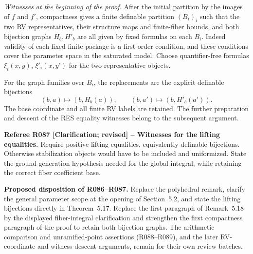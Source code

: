 \documentclass[12pt]{amsart}
\theoremstyle{remark}
\theoremstyle{definition}
\numberwithin{equation}{section}
\theoremstyle{plain}
\begin{document}
{\emph{Witnesses at the beginning of the proof.}
After the initial partition by the images of $f$ and $f'$,
compactness gives a finite definable partition $(B_i)_i$
such that the two RV representatives, their structure maps
and finite-fiber bounds, and both bijection graphs
$H_b,H'_b$ are all given by fixed formulas on each $B_i$.
Indeed validity of each fixed finite package is a first-order
condition, and these conditions cover the parameter space
in the saturated model. Choose quantifier-free formulas
$\xi_i(x,y)$, $\xi'_i(x,y')$ for the two representative objects.

For the graph families over $B_i$, the replacements are the
explicit definable bijections
\[
 (b,a)\longmapsto(b,H_b(a)),\qquad
 (b,a')\longmapsto(b,H'_b(a')).
\]
The base coordinate and all finite RV labels are retained.
The further preparation and descent of the RES equality
witnesses belong to the subsequent argument.
}
\medskip

{\normalfont\small\color{RefereePurple}
\noindent\textbf{Referee R087 [Clarification; revised] --
Witnesses for the lifting equalities.}
Require positive lifting equalities, equivalently definable
bijections. Otherwise stabilization objects would have to be
included and uniformized. State the ground-generation hypothesis
needed for the global integral, while retaining the correct
fiber coefficient base.\par}
\medskip

{\normalfont\small\color{ProposalOrange}
\noindent\textbf{Proposed disposition of R086--R087.}
Replace the polyhedral remark, clarify the general parameter
scope at the opening of Section~5.2, and state the lifting
bijections directly in Theorem~5.17.
Replace the first paragraph of Remark~5.18 by the displayed
fiber-integral clarification and strengthen the first compactness
paragraph of the proof to retain both bijection graphs.
The arithmetic comparison and unramified-point assertions
(R088--R089), and the later RV-coordinate and witness-descent
arguments, remain for their own review batches.}
\end{document}
